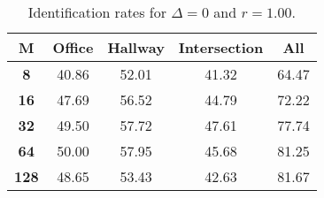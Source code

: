 \begin{table}[h]
    \footnotesize
    \centering
    \begin{tabular}{|c|c|c|c|l|}    
    \hline
    {\bf M} & {\bf Office} & {\bf Hallway} & {\bf Intersection} &     \multicolumn{1}{c|}{{\bf All}} \\ \hline
    {\bf 8} & 40.86 & 52.01 & 41.32 & 64.47 \\ \hline
    {\bf 16} & 47.69 & 56.52 & 44.79 & 72.22 \\ \hline
    {\bf 32} & 49.50 & 57.72 & 47.61 & 77.74 \\ \hline
    {\bf 64} & 50.00 & 57.95 & 45.68 & 81.25 \\ \hline
    {\bf 128} & 48.65 & 53.43 & 42.63 & 81.67 \\ \hline
    \end{tabular}
    \caption{Identification rates for $\Delta = 0$ and $r = 1.00$.}    
    \label{tab:identify_speakers_1.00_mit_19_0}
\end{table}
